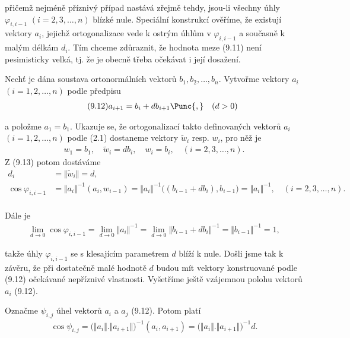 \noindent
přičemž nejméně příznivý případ nastává zřejmě tehdy, jsou-li všechny
úhly $\varphi_{i,i-1}$ $(i=2,3,\ldots,n)$ blízké nule.  Speciální
konstrukcí ověříme, že existují vektory $a_i$, jejichž ortogonalizace
vede k ostrým úhlům v $\varphi_{i,i-1}$ a současně k malým délkám
$d_i$. Tím chceme zdůraznit, že hodnota meze (9.11) není pesimisticky
velká, tj. že je obecně třeba očekávat i její dosažení.


Nechť je dána soustava ortonormálních vektorů $b_1,b_2,\ldots,b_n$.
Vytvořme vektory $a_i$ $(i=1,2,\ldots,n)$ podle předpisu
%
\begin{align*}
\tag{9.12}
a_{i+1} = b_i + d b_{i+1}\Punc{,}\quad (d>0)
\end{align*}

\noindent
a položme $a_1=b_1$. Ukazuje se, že ortogonalizací takto definovaných
vektorů $a_i$ $(i=1,2,\ldots,n)$ podle (2.1) dostaneme vektory
$\widetilde w_i$ resp. $w_i$, pro něž je
%
\begin{align*}
\tag{9.13}
w_1 = b_1, \quad \widetilde w_i = db_i, \quad w_i=b_i, \quad
(i=2,3,\dots,n).
\end{align*}
%
Z (9.13) potom dostáváme
%
\begin{align*}
\tag{9.14}
d_i &= \Vert \widetilde w_i \Vert = d,\\
\tag{9.15}
\cos \varphi_{i,i-1} &= \Vert a_i \Vert^{-1} (a_i,w_{i-1}) =
   \Vert a_i \Vert^{-1}\big((b_{i-1} + db_i), b_{i-1}\big) =
   \Vert a_i \Vert^{-1}, \quad (i=2,3,\ldots,n).\\
\end{align*}

\noindent
Dále je
%
\begin{align*}
\tag{9.16}
\lim_{d \rightarrow 0} \cos \varphi_{i,i-1} =
\lim_{d \rightarrow 0} \Vert a_i \Vert^{-1} =
\lim_{d \rightarrow 0} \Vert b_{i-1} + db_i \Vert^{-1} =
\Vert b_{i-1} \Vert^{-1} = 1,
\end{align*}

\noindent
takže úhly $\varphi_{i,i-1}$ se s klesajícím parametrem $d$ blíží k
nule.  Došli jsme tak k závěru, že při dostatečně malé hodnotě $d$ budou
mít vektory konstruované podle (9.12) očekávané nepříznivé
vlastnosti. Vyšetříme ještě vzájemnou polohu vektorů $a_i$ (9.12).


Označme  $\psi_{i,j}$ úhel vektorů $a_i$ a $a_j$
(9.12). Potom platí
%
\begin{align*}
\tag{9.17}
\cos \psi_{i,j} = \big(\Vert a_i\Vert.\Vert a_{i+1}\Vert\big)^{-1}
   (a_i,a_{i+1}) = \big(\Vert a_i\Vert.\Vert a_{i+1}\Vert\big)^{-1} d.
\end{align*}

